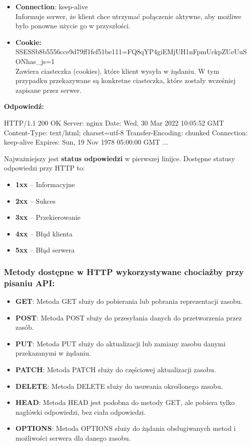 \begin{itemize}[label=--]
  \item \textbf{Connection}: keep-alive \\
  Informuje serwer, że klient chce utrzymać połączenie aktywne, aby możliwe było ponowne użycie go w przyszłości.
  
  \item \textbf{Cookie:} SSESSb8b5556cce9d79ff1fef51be111=FQ8qYP4giEMjUH1nFpmUckpZUeUuSONhas\_js=1  \\
  Zawiera ciasteczka (cookies), które klient wysyła w żądaniu. W tym przypadku przekazywane są konkretne ciasteczka, które zostały wcześniej zapisane przez serwer.
\end{itemize}

\begin{example}
    \textbf{Odpowiedź:}

    \begin{java}
HTTP/1.1 200 OK
Server: nginx
Date: Wed, 30 Mar 2022 10:05:52 GMT
Content-Type: text/html; charset=utf-8
Transfer-Encoding: chunked
Connection: keep-alive
Expires: Sun, 19 Nov 1978 05:00:00 GMT
...
    \end{java}
\end{example}
    Najważniejszy jest \textbf{status odpowiedzi} w pierwszej linijce. Dostępne statusy odpowiedzi przy HTTP to:
    \begin{itemize}
  \item \textbf{1xx} -- Informacyjne
  \item \textbf{2xx} -- Sukces
  \item \textbf{3xx} -- Przekierowanie
  \item \textbf{4xx} -- Błąd klienta
  \item \textbf{5xx} -- Błąd serwera
\end{itemize}

\subsubsection{Metody dostępne w HTTP wykorzystywane chociażby przy pisaniu API:}
\begin{itemize}
    \item \textbf{GET}: Metoda GET służy do pobierania lub pobrania reprezentacji zasobu.
    \item \textbf{POST}: Metoda POST służy do przesyłania danych do przetworzenia przez zasób.
    \item \textbf{PUT}: Metoda PUT służy do aktualizacji lub zamiany zasobu danymi przekazanymi w żądaniu.
    \item \textbf{PATCH}: Metoda PATCH służy do częściowej aktualizacji zasobu.
    \item \textbf{DELETE}: Metoda DELETE służy do usuwania określonego zasobu.
    \item \textbf{HEAD}: Metoda HEAD jest podobna do metody GET, ale pobiera tylko nagłówki odpowiedzi, bez ciała odpowiedzi.
    \item \textbf{OPTIONS}: Metoda OPTIONS służy do żądania obsługiwanych metod i możliwości serwera dla danego zasobu.
\end{itemize}


